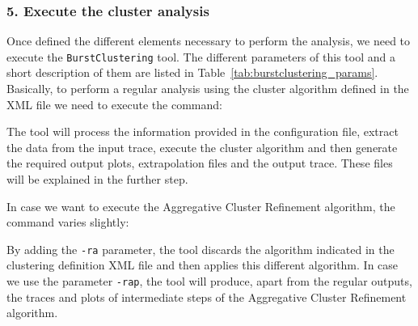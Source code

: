 \documentclass[twoside,a4,english,11pt]{book}
\begin{document}
\subsubsection*{5. Execute the cluster analysis}

Once defined the different elements necessary to perform the analysis, we
need to execute the \texttt{BurstClustering} tool. The different parameters 
of this tool and a short description of them are listed in 
Table~\ref{tab:burstclustering_params}. Basically, to perform a regular 
analysis using the cluster algorithm defined in the XML file we need to 
execute the command:

\begin{figure}[!h]
  

\end{figure}

The tool will process the information provided in the configuration file,
extract the data from the input trace, execute the cluster algorithm and then
generate the required output plots, extrapolation files and the output trace.
These files will be explained in the further step.

In case we want to execute the Aggregative Cluster Refinement algorithm, the
command varies slightly:

\begin{figure}[!h]
  

\end{figure}

By adding the \texttt{-ra} parameter, the tool discards the algorithm
indicated in the clustering definition XML file and then applies this
different algorithm. In case we use the parameter \texttt{-rap}, the tool
will produce, apart from the regular outputs, the traces and plots of 
intermediate steps of the Aggregative Cluster Refinement algorithm.
\end{document}
